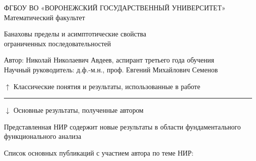 \documentclass[a4paper,openbib]{report}
\theoremstyle{definition}
\begin{document}
\thispagestyle{empty}
	\Large
	\begin{center}
		ФГБОУ ВО
		«ВОРОНЕЖСКИЙ ГОСУДАРСТВЕННЫЙ УНИВЕРСИТЕТ»
		\\
		Математический факультет
	\end{center}
	\begin{center}
		\Huge
		Банаховы пределы и асимптотические свойства \\ ограниченных последовательностей
	\end{center}
	Автор: Николай Николаевич Авдеев, аспирант третьего года обучения
	\\
	Научный руководитель: д.ф.-м.н., проф. Евгений Михайлович Семенов
	\\
	\nocite{avdeev2021subsets,our-mz2019measure,avdeev2019space,our-ped-2018-alpha-Tx,our-vzms-2018}

	\noindent
	
	\vfill
	\qquad$\uparrow$ Классические понятия и результаты, использованные в работе
	\hrule
	\qquad$\downarrow$ Основные результаты, полученные автором
	\vfill
	\noindent
	
	\hfill
	


	\vfill

	Представленная НИР содержит новые результаты в области фундаментального функционального анализа
	\begin{center}
		Список основных публикаций с участием автора по теме НИР:
	\end{center}

	\renewcommand{\section}[2]{}%
	\renewcommand{\chapter}[2]{}%
	\printbibliography{}
\end{document}
